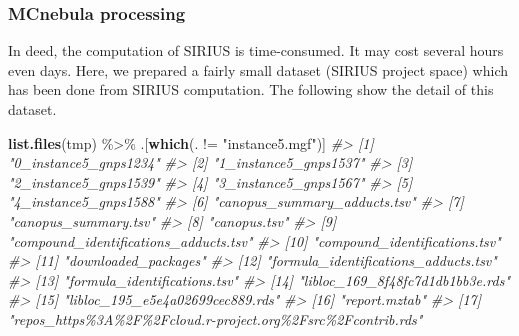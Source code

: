 \documentclass[]{tufte-handout}
\newenvironment{Shaded}{}{}
\newcommand{\CommentTok}[1]{\textcolor[rgb]{0.38,0.63,0.69}{\textit{#1}}}
\newcommand{\KeywordTok}[1]{\textcolor[rgb]{0.00,0.44,0.13}{\textbf{#1}}}
\newcommand{\NormalTok}[1]{#1}
\newcommand{\OperatorTok}[1]{\textcolor[rgb]{0.40,0.40,0.40}{#1}}
\newcommand{\StringTok}[1]{\textcolor[rgb]{0.25,0.44,0.63}{#1}}
\begin{document}
\hypertarget{mcnebula-processing}{%
\subsubsection{MCnebula processing}\label{mcnebula-processing}}

In deed, the computation of SIRIUS is time-consumed. It may cost several
hours even days. Here, we prepared a fairly small dataset (SIRIUS
project space) which has been done from SIRIUS computation. The
following show the detail of this dataset.

\begin{Shaded}
\begin{Highlighting}[]
\KeywordTok{list.files}\NormalTok{(tmp) }\OperatorTok{\%\textgreater{}\%}\StringTok{ }
\StringTok{  }\NormalTok{.[}\KeywordTok{which}\NormalTok{(. }\OperatorTok{!=}\StringTok{ "instance5.mgf"}\NormalTok{)]}
\CommentTok{\#\textgreater{}  [1] "0\_instance5\_gnps1234"                                       }
\CommentTok{\#\textgreater{}  [2] "1\_instance5\_gnps1537"                                       }
\CommentTok{\#\textgreater{}  [3] "2\_instance5\_gnps1539"                                       }
\CommentTok{\#\textgreater{}  [4] "3\_instance5\_gnps1567"                                       }
\CommentTok{\#\textgreater{}  [5] "4\_instance5\_gnps1588"                                       }
\CommentTok{\#\textgreater{}  [6] "canopus\_summary\_adducts.tsv"                                }
\CommentTok{\#\textgreater{}  [7] "canopus\_summary.tsv"                                        }
\CommentTok{\#\textgreater{}  [8] "canopus.tsv"                                                }
\CommentTok{\#\textgreater{}  [9] "compound\_identifications\_adducts.tsv"                       }
\CommentTok{\#\textgreater{} [10] "compound\_identifications.tsv"                               }
\CommentTok{\#\textgreater{} [11] "downloaded\_packages"                                        }
\CommentTok{\#\textgreater{} [12] "formula\_identifications\_adducts.tsv"                        }
\CommentTok{\#\textgreater{} [13] "formula\_identifications.tsv"                                }
\CommentTok{\#\textgreater{} [14] "libloc\_169\_8f48fc7d1db1bb3e.rds"                            }
\CommentTok{\#\textgreater{} [15] "libloc\_195\_e5e4a02699cec889.rds"                            }
\CommentTok{\#\textgreater{} [16] "report.mztab"                                               }
\CommentTok{\#\textgreater{} [17] "repos\_https\%3A\%2F\%2Fcloud.r{-}project.org\%2Fsrc\%2Fcontrib.rds"}
\end{Highlighting}
\end{Shaded}
\end{document}
